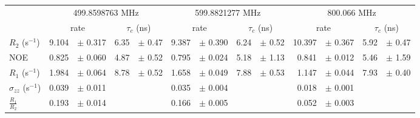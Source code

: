 \documentclass[showkeys,aps,prb,prepreint,amssymb, amsmath,nobibnotes]{article}
\begin{document}
\begin{small}
\noindent \begin{tabular}{l|rlrl|rlrl|rlrl}
& \multicolumn{4}{c}{499.8598763 MHz}& \multicolumn{4}{c}{599.8821277 MHz}& \multicolumn{4}{c}{800.066 MHz}\\
&  \multicolumn{2}{c}{rate} & \multicolumn{2}{c}{$\tau_c$ (ns)}   &  \multicolumn{2}{c}{rate} & \multicolumn{2}{c}{$\tau_c$ (ns)}   &  \multicolumn{2}{c}{rate} & \multicolumn{2}{c}{$\tau_c$ (ns)}   \\
\hline$R_2$  (s$^{-1}$)  &  9.104 & $\pm$ 0.317   &  6.35 & $\pm$ 0.47 &  9.387 & $\pm$ 0.390   &  6.24 & $\pm$ 0.52 &  10.397 & $\pm$ 0.367   &  5.92 & $\pm$ 0.47 \\
NOE  &  0.825 & $\pm$ 0.060   &  4.87 & $\pm$ 0.52 &  0.795 & $\pm$ 0.024   &  5.18 & $\pm$ 1.13 &  0.841 & $\pm$ 0.012   &  5.46 & $\pm$ 1.59 \\
$R_1$ (s$^{-1}$)  &  1.984 & $\pm$ 0.064   &  8.78 & $\pm$ 0.52 &  1.658 & $\pm$ 0.049   &  7.88 & $\pm$ 0.53 &  1.147 & $\pm$ 0.044   &  7.93 & $\pm$ 0.40 \\
$\sigma_{zz}$  (s$^{-1}$)  &  0.039 & $\pm$ 0.011   & & &  0.035 & $\pm$ 0.004   & & &  0.018 & $\pm$ 0.001   & & \\
$\frac{R_1}{R_2}$  &  0.193 & $\pm$ 0.014   & & &  0.166 & $\pm$ 0.005   & & &  0.052 & $\pm$ 0.003   & & \\
\end{tabular}
\end{small}
\end{document}
